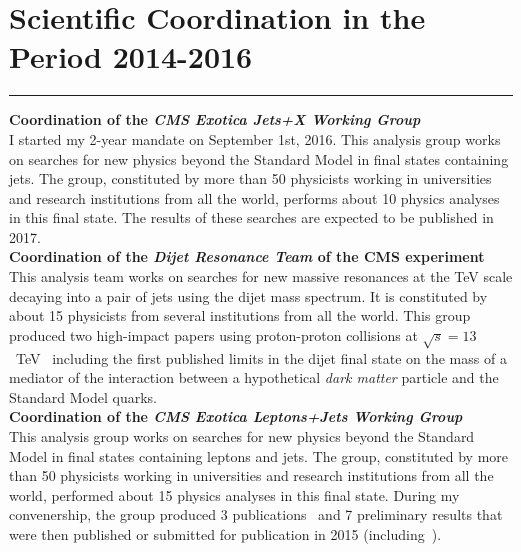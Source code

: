 \documentclass[10pt, a4paper]{article}
\newcommand{\years}[1]{\marginnote{\hskip-0.2in{\small #1}}}
\begin{document}
\section*{Scientific Coordination in the Period 2014-2016}
\vspace{-5pt}
\hrule
\vspace{10pt}
\years{09/2016 - today}\textbf{Coordination of the \emph{CMS Exotica
    Jets+X Working Group}} \\
I started my 2-year mandate on September 1st, 2016.
This analysis group works on searches for new physics beyond the
Standard Model in final states containing jets. The group, 
constituted by more than 50 physicists working in universities and
research institutions from all the world, performs
about 10 physics analyses in this final state. The results of these
searches are expected to be published in 2017. \\ [1em]
\years{09/2014 - 09/2016}\textbf{Coordination of the \emph{Dijet Resonance
  Team} of the CMS experiment}\\
This analysis team works on searches for new massive resonances at the TeV
scale decaying into a pair of jets using the dijet mass spectrum. It is
constituted by about 15 physicists from several institutions from
all the world. This group produced two high-impact papers using proton-proton
collisions at $\sqrt{s}=13$~TeV~\cite{Sirunyan:2016iap,Khachatryan:2015dcf} 
including the first published limits in the dijet final state on the
mass of a mediator of the interaction between a hypothetical {\it dark
  matter} particle and the Standard Model quarks.\\[1em]
\years{01/2013 - 01/2015}\textbf{Coordination of the \emph{CMS Exotica
    Leptons+Jets Working Group}}\\
This analysis group works on searches for new physics beyond the
Standard Model in final states containing leptons and jets. The group, 
constituted by more than 50 physicists working in universities and
research institutions from all the world, performed about 15 physics
analyses in this final state. During my convenership, the group
produced 3 publications~\cite{Khachatryan:2014ura,Khachatryan:2014dka,Khachatryan:2014gha}
and 7 preliminary results that were then published or submitted for
publication in 2015 (including~\cite{Khachatryan:2016yji,Khachatryan:2015ywa,Khachatryan:2015vaa}).
\end{document}
